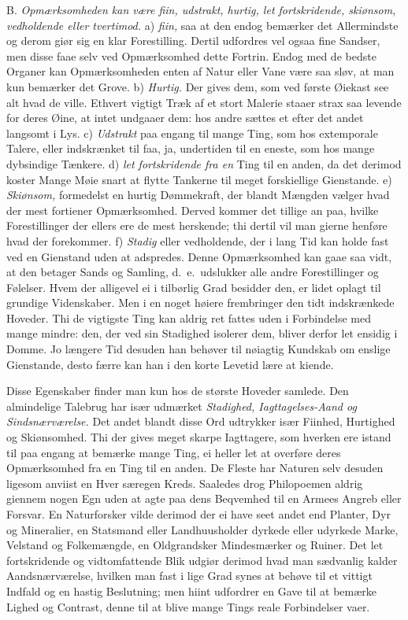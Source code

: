 \documentclass[12pt,a4paper]{article}
\newcommand{\opage}[1]{\marginnote{\footnotesize\textit{[#1]}}}
\begin{document}
B. \emph{Opmærksomheden kan være fiin, udstrakt, hurtig, let fortskridende, skiønsom,
vedholdende eller tvertimod.} a) \emph{fiin,} saa at den endog bemærker det
Allermindste og derom giør sig en klar Forestilling. Dertil udfordres vel ogsaa fine
Sandser, men disse faae selv ved Opmærksomhed dette Fortrin. Endog med de bedste
Organer kan Opmærksomheden enten af Natur eller Vane være saa sløv, at man kun
bemærker det Grove. b) \emph{Hurtig.} Der gives dem, som ved første Øiekast see alt
hvad de ville. Ethvert vigtigt Træk af et stort Malerie staaer strax saa levende for
deres Øine, at intet undgaaer dem: hos andre sættes et efter det andet langsomt i Lys.
c) \emph{Udstrakt} paa engang til mange Ting, som hos extemporale Talere, eller
indskrænket til faa, ja, undertiden til en eneste, som hos mange dybsindige Tænkere.
d) \emph{let fortskridende fra en}
\opage{57} %
Ting til en anden, da det derimod koster Mange Møie
snart at flytte Tankerne til meget forskiellige Gienstande. e) \emph{Skiønsom,}
formedelst en hurtig Dømmekraft, der blandt Mængden vælger hvad der mest fortiener
Opmærksomhed. Derved kommer det tillige an paa, hvilke Forestillinger der ellers ere
de mest herskende; thi dertil vil man gierne henføre hvad der forekommer.
f) \emph{Stadig} eller vedholdende, der i lang Tid kan holde fast ved en Gienstand
uden at adspredes. Denne Opmærksomhed kan gaae saa vidt, at den betager Sands og
Samling, d.~e.\ udslukker alle andre Forestillinger og Følelser. Hvem der alligevel ei
i tilbørlig Grad besidder den, er lidet oplagt til grundige Videnskaber. Men i en
noget høiere frembringer den tidt indskrænkede Hoveder. Thi de vigtigste Ting kan
aldrig ret fattes uden i Forbindelse med mange mindre: den, der ved sin Stadighed
isolerer dem, bliver derfor let ensidig i Domme. Jo længere Tid desuden han behøver
til nøiagtig Kundskab om enslige Gienstande, desto færre kan han i den korte Levetid
lære at kiende.

Disse Egenskaber finder man kun hos de største Hoveder samlede. Den almindelige
Talebrug har især udmærket \emph{Stadighed, Iagttagelses-Aand og Sindsnærværelse.} Det
andet blandt disse Ord udtrykker især Fiinhed, Hurtighed og Skiønsomhed. Thi der gives
meget skarpe Iagttagere, som hverken ere istand til paa engang at bemærke mange Ting,
ei
\opage{58} heller let at overføre deres Opmærksomhed fra en Ting til en anden. De Fleste har
Naturen selv desuden ligesom anviist en Hver særegen Kreds. Saaledes drog Philopoemen
aldrig giennem nogen Egn uden at agte paa dens Beqvemhed til en Armees Angreb eller
Forsvar. En Naturforsker vilde derimod der ei have seet andet end Planter, Dyr og
Mineralier, en Statsmand eller Landhuusholder dyrkede eller udyrkede Marke, Velstand
og Folkemængde, en Oldgrandsker Mindesmærker og Ruiner. Det let fortskridende og
vidtomfattende Blik udgiør derimod hvad man sædvanlig kalder Aandsnærværelse, hvilken
man fast i lige Grad synes at behøve til et vittigt Indfald og en hastig Beslutning;
men hiint udfordrer en Gave til at bemærke Lighed og Contrast, denne til at blive mange
Tings reale Forbindelser vaer.
\end{document}
